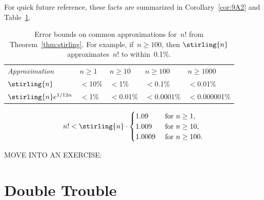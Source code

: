 For quick future reference, these facts are summarized in
Corollary~\ref{cor:9A2} and Table~\ref{fig:9A1}.

\begin{table}\redrawntrue

\renewcommand{\arraystretch}{1.5}

\begin{tabular}{l|llll}

\multicolumn{1}{l}{\emph{Approximation}}
    & $n \ge 1$
    & $n \ge 10$
    & $n \ge 100$
    & $n \ge 1000$ \\
\cline{2-5}
$\stirling{n}$
    & ${}<{}$10\%
    & ${}<{}$1\%
    & ${}<{}$0.1\%
    & ${}<{}$0.01\%\\

$\stirling{n} e^{1/12n}$
    & ${}<{}$1\%
    & ${}<{}$0.01\%
    & ${}<{}$0.0001\%
    & ${}<{}$0.000001\%
\end{tabular}

\caption{Error bounds on common approximations for~$n!$ from
  Theorem~\ref{thm:stirling}.  For example, if~$n \ge 100$, then
  $\protect\stirling{n}$ approximates~$n!$ to within~0.1\%.}

\label{fig:9A1}

\end{table}

\begin{corollary}\label{cor:9A2}
\begin{align*}
n! < \stirling{n} \cdot
 \begin{cases}
1.09 & \text{ for }   n \ge 1,\\
1.009 & \text{ for }  n \ge 10,\\
1.0009 & \text{ for } n \ge 100.
\end{cases}
\end{align*}

\end{corollary}

\begin{editingnotes}
MOVE INTO AN EXERCISE:
\end{editingnotes}

\section{Double Trouble}\label{doublesum_sec}

